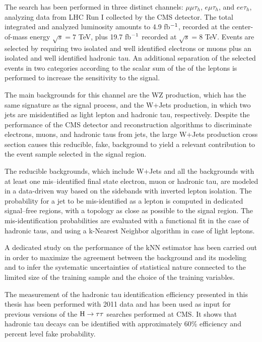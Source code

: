 The search has been performed in three distinct channels: $\mu\mu\tau_h$, $e\mu\tau_h$, and $ee\tau_h$, analyzing data from LHC Run I collected by the CMS detector. The total integrated and analyzed luminosity amounts to 4.9 fb$^{-1}$, recorded at the center-of-mass energy $\sqrt{s} = 7$ TeV, plus 19.7 fb$^{-1}$ recorded at $\sqrt{s} = 8$ TeV. Events are selected by requiring two isolated and well identified electrons or muons plus an isolated and well identified hadronic tau. An additional separation of the selected events in two categories according to the scalar sum of the \pT of the leptons is performed to increase %
the sensitivity to the signal. 

The main backgrounds for this channel are the WZ production, which has the same signature as the signal process, and the W+Jets production, in which two jets are misidentified as light lepton and hadronic tau, respectively. 
Despite the performance of the CMS detector and reconstruction algorithms to discriminate electrons, muons, and hadronic taus from jets, the large W+Jets production cross section causes this reducible, fake, background to yield a relevant contribution to the event sample selected in the signal region.

The reducible backgrounds, which include W+Jets and all the backgrounds with at least one mis--identified final state electron, muon or hadronic tau, are modeled in a data-driven way based on the  sidebands with inverted lepton isolation. The probability for a jet to be mis-identified as a lepton is computed in dedicated signal--free regions, with a topology as close as possible to the signal region. The mis-identification probabilities are evaluated with a functional fit in the case of hadronic taus, and using a k-Nearest Neighbor algorithm in case of light leptons. 

A dedicated study on the performance of the kNN estimator has been carried out in order to maximize the agreement between the background and its modeling and to infer the systematic uncertainties of statistical nature connected to the limited size of the training sample and the choice of the training variables.

The measurement of the hadronic tau identification efficiency presented in this thesis has been performed with 2011 data and has been used as input for previous versions of the $\mathrm{H} \rightarrow \tau \tau$ searches performed at CMS. It shows that hadronic tau decays can be identified with approximately 60\% efficiency and percent level fake probability.

